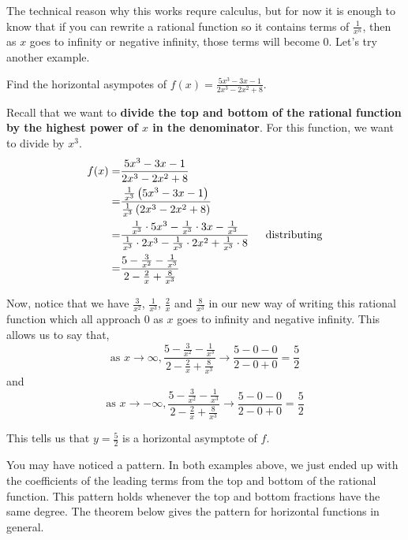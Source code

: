 \documentclass{ximera}
\begin{document}
The technical reason why this works requre calculus, but for now it is enough to know that if you can rewrite a rational function so it contains terms of $\frac{1}{x^n}$, then as $x$ goes to infinity or negative infinity, those terms will become $0$.  Let's try another example.

\begin{example}  Find the horizontal asympotes of $f(x) = \frac{5x^3-3x-1}{2x^3-2x^2+8}$.

\begin{explanation}
Recall that we want to \textbf{divide the top and bottom of the rational function by the highest power of $x$ in the denominator}.  For this function, we want to divide by $x^3$.
\begin{align*}
f(x) =& \frac{5x^3-3x-1}{2x^3-2x^2+8}\\
=& \frac{\frac{1}{x^3}\left(5x^3-3x-1\right)}{\frac{1}{x^3}\left(2x^3-2x^2+8\right)} \\
=& \frac{\frac{1}{x^3} \cdot 5x^3-\frac{1}{x^3}\cdot 3x - \frac{1}{x^3}}{\frac{1}{x^3}\cdot 2x^3-\frac{1}{x^3} \cdot 2x^2 + \frac{1}{x^3} \cdot 8} \text{ \, \,\,    distributing} \\
=& \frac{5-\frac{3}{x^2}-\frac{1}{x^3}}{2-\frac{2}{x}+\frac{8}{x^3}} \\
\end{align*}

Now, notice that we have $\frac{3}{x^2}$, $\frac{1}{x^3}$, $\frac{2}{x}$ and $\frac{8}{x^3}$ in our new way of writing this rational function which all approach $0$ as $x$ goes to infinity and negative infinity.  This allows us to say  that,
\[
\text{as } x \rightarrow \infty, \frac{5-\frac{3}{x^2}-\frac{1}{x^3}}{2-\frac{2}{x}+\frac{8}{x^3}} \rightarrow \frac{5-0-0}{2-0+0}=\frac{5}{2}
\]
and
\[
\text{as } x \rightarrow -\infty, \frac{5-\frac{3}{x^2}-\frac{1}{x^3}}{2-\frac{2}{x}+\frac{8}{x^3}} \rightarrow \frac{5-0-0}{2-0+0}=\frac{5}{2}
\]

This tells us that $y=\frac{5}{2}$ is a horizontal asymptote of $f$.
\end{explanation}
\end{example}

You may have noticed a pattern.  In both examples above, we just ended up with the coefficients of the leading terms from the top and bottom of the rational function.  This pattern holds whenever the top and bottom fractions have the same degree.  The theorem below gives the pattern for horizontal functions in general.
\end{document}
